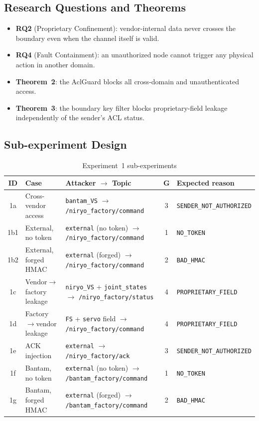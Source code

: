 \documentclass[11pt,a4paper]{article}
\begin{document}
\subsection{Research Questions and Theorems}

\begin{itemize}
  \item \textbf{RQ2} (Proprietary Confinement): vendor-internal data never
    crosses the boundary even when the channel itself is valid.
  \item \textbf{RQ4} (Fault Containment): an unauthorized node cannot trigger
    any physical action in another domain.
  \item \textbf{Theorem~2}: the AclGuard blocks all cross-domain and
    unauthenticated access.
  \item \textbf{Theorem~3}: the boundary key filter blocks proprietary-field
    leakage independently of the sender's ACL status.
\end{itemize}

\subsection{Sub-experiment Design}

\begin{table}[h]
\centering
\caption{Experiment~1 sub-experiments}
\label{tab:exp1-design}
\footnotesize
\setlength{\tabcolsep}{5pt}
\begin{tabular}{@{}c p{2.6cm} p{4.8cm} c p{3.0cm}@{}}
\toprule
\textbf{ID} & \textbf{Case} & \textbf{Attacker} $\to$ \textbf{Topic} & \textbf{G} & \textbf{Expected reason} \\
\midrule
1a  & Cross-vendor access       & \texttt{bantam\_VS} $\to$ \texttt{/niryo\_factory/command}       & 3 & \texttt{SENDER\_NOT\_AUTHORIZED} \\
1b1 & External, no token        & \texttt{external} (no token) $\to$ \texttt{/niryo\_factory/command}   & 1 & \texttt{NO\_TOKEN} \\
1b2 & External, forged HMAC     & \texttt{external} (forged) $\to$ \texttt{/niryo\_factory/command}     & 2 & \texttt{BAD\_HMAC} \\
1c  & Vendor$\to$factory leakage& \texttt{niryo\_VS} + \texttt{joint\_states} $\to$ \texttt{/niryo\_factory/status} & 4 & \texttt{PROPRIETARY\_FIELD} \\
1d  & Factory$\to$vendor leakage& \texttt{FS} + \texttt{servo} field $\to$ \texttt{/niryo\_factory/command}       & 4 & \texttt{PROPRIETARY\_FIELD} \\
1e  & ACK injection             & \texttt{external} $\to$ \texttt{/niryo\_factory/ack}               & 3 & \texttt{SENDER\_NOT\_AUTHORIZED} \\
1f  & Bantam, no token          & \texttt{external} (no token) $\to$ \texttt{/bantam\_factory/command} & 1 & \texttt{NO\_TOKEN} \\
1g  & Bantam, forged HMAC       & \texttt{external} (forged) $\to$ \texttt{/bantam\_factory/command}   & 2 & \texttt{BAD\_HMAC} \\
\bottomrule
\end{tabular}
\end{table}
\end{document}
